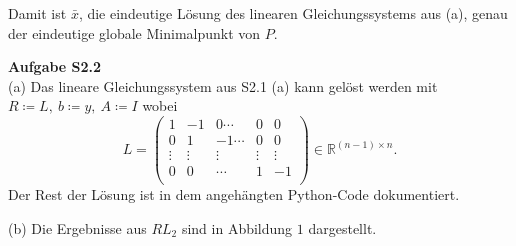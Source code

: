 \documentclass[ngerman, a4paper,12pt]{article}
\begin{document}
Damit ist $\bar{x}$, die eindeutige Lösung des linearen Gleichungssystems aus (a), genau der eindeutige globale Minimalpunkt von $P$.
\par
\textbf{Aufgabe S2.2} \\
(a) Das lineare Gleichungssystem aus S2.1 (a) kann gelöst werden mit $R \coloneqq L, \ b \coloneqq y, \ A \coloneqq I$ wobei
\begin{equation*}
	L = \begin{pmatrix}
	1 &-1 & 0 \cdots &0 &0\\
	0 & 1 & -1 \cdots &0 &0\\
	\vdots & \vdots & \vdots & \vdots & \vdots \\
	0 & 0 & \cdots & 1 & -1\\ 
	\end{pmatrix} \in \mathbb R^{(n-1)\times n}.
\end{equation*}
Der Rest der Lösung ist in dem angehängten Python-Code dokumentiert.
\par
(b) Die Ergebnisse aus $RL_2$ sind in Abbildung $1$ dargestellt. 
\end{document}
